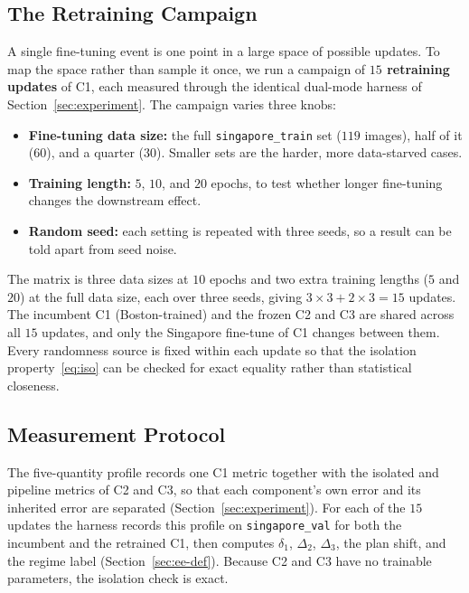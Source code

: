 \documentclass[conference]{IEEEtran}
\begin{document}
\subsection{The Retraining Campaign}
\label{sec:campaign}
A single fine-tuning event is one point in a large space of possible updates. To
map the space rather than sample it once, we run a campaign of \textbf{$15$
retraining updates} of C1, each measured through the identical dual-mode harness
of Section~\ref{sec:experiment}. The campaign varies three knobs:
\begin{itemize}
\item \textbf{Fine-tuning data size:} the full \texttt{singapore\_train} set
($119$ images), half of it ($60$), and a quarter ($30$). Smaller sets are the
harder, more data-starved cases.
\item \textbf{Training length:} $5$, $10$, and $20$ epochs, to test whether
longer fine-tuning changes the downstream effect.
\item \textbf{Random seed:} each setting is repeated with three seeds, so a
result can be told apart from seed noise.
\end{itemize}
The matrix is three data sizes at $10$ epochs and two extra training lengths
($5$ and $20$) at the full data size, each over three seeds, giving
$3\times3 + 2\times3 = 15$ updates. The incumbent C1 (Boston-trained) and the
frozen C2 and C3 are shared across all $15$ updates, and only the Singapore
fine-tune of C1 changes between them. Every randomness source is fixed within each update so that the
isolation property~\eqref{eq:iso} can be checked for exact equality rather than
statistical closeness.

\subsection{Measurement Protocol}
The five-quantity profile records one C1 metric together with the isolated and
pipeline metrics of C2 and C3, so that each component's own error and its
inherited error are separated (Section~\ref{sec:experiment}). For each of the
$15$ updates the harness records this profile on \texttt{singapore\_val} for both
the incumbent and the retrained C1, then computes $\delta_1$, $\Delta_2$,
$\Delta_3$, the plan shift, and the regime label (Section~\ref{sec:ee-def}).
Because C2 and C3 have no trainable parameters, the isolation check is exact.

\end{document}
